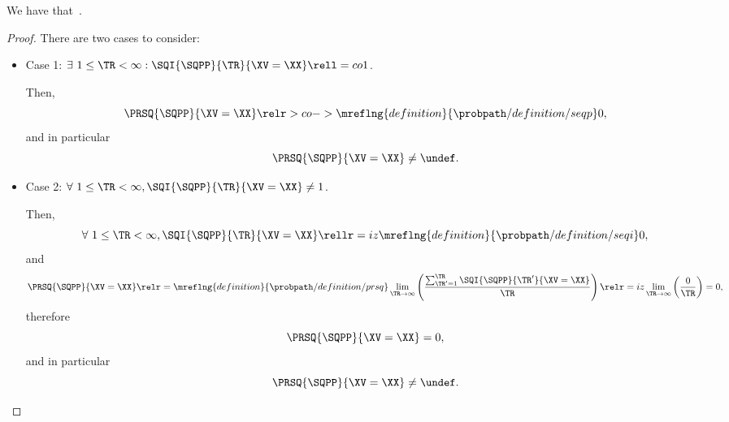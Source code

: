 \begin{proposition}
  We have that\ \sqpproblimdefprop.%
\end{proposition}

\begin{proof}
  There are two cases to consider:
  \begin{itemize}
    \item Case 1: $\exists\ 1 \le \TR < \infty : \SQI{\SQPP}{\TR}{\XV = \XX} \rell = co 1$.

      Then,
      $$\PRSQ{\SQPP}{\XV = \XX} \relr > co->\mreflng{definition}{\probpath/definition/seqp} 0,$$
      and in particular
      $$\PRSQ{\SQPP}{\XV = \XX} \ne \undef.$$

    \item Case 2: $\forall\ 1 \le \TR < \infty, \SQI{\SQPP}{\TR}{\XV= \XX} \ne 1$.

      Then,
      $$\forall\ 1 \le \TR < \infty, \SQI{\SQPP}{\TR}{\XV = \XX} \rellr = iz \mreflng{definition}{\probpath/definition/seqi} 0,$$
      and
      $$\PRSQ{\SQPP}{\XV = \XX} 
      \relr = \mreflng{definition}{\probpath/definition/prsq} \lim_{\TR \rightarrow \infty}\left(\frac{\sum_{\TR' = 1}^{\TR}\SQI{\SQPP}{\TR'}{\XV= \XX}}{\TR}\right)
      \relr = iz \lim_{\TR \rightarrow \infty}\left(\frac{0}{\TR}\right) = 0
      ,$$
      therefore
      $$\PRSQ{\SQPP}{\XV = \XX} = 0,$$
      and in particular
      $$\PRSQ{\SQPP}{\XV = \XX} \ne \undef.$$
  \end{itemize}
\end{proof}
